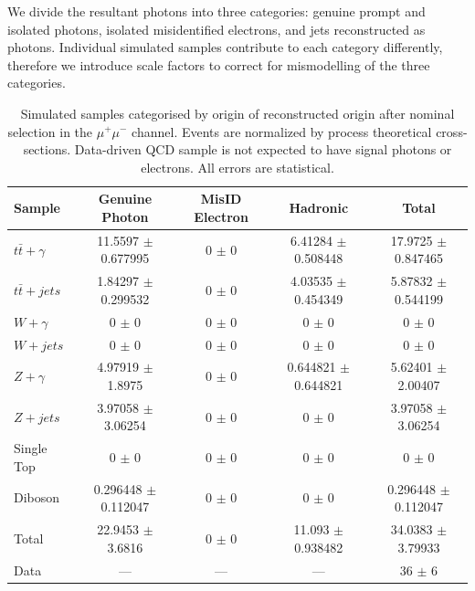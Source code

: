 We divide the resultant photons into three categories: genuine prompt and isolated photons, isolated misidentified electrons, and jets reconstructed as photons. Individual simulated samples contribute to each category differently, therefore we introduce scale factors to correct for mismodelling of the three categories. 

\begin{table}
\resizebox{\columnwidth}{!} {
\begin{tabular}{l|ccc|c}
\hline
	\textbf{Sample} & \textbf{Genuine Photon} & \textbf{MisID Electron} & \textbf{Hadronic} & \textbf{Total} \\
\hline
$t\bar{t}+\gamma$  & 11.5597 $\pm$ 0.677995 & 0 $\pm$ 0 & 6.41284 $\pm$ 0.508448 & 17.9725 $\pm$ 0.847465 \\
$t\bar{t}+jets$  & 1.84297 $\pm$ 0.299532 & 0 $\pm$ 0 & 4.03535 $\pm$ 0.454349 & 5.87832 $\pm$ 0.544199 \\
$W+\gamma$  & 0 $\pm$ 0 & 0 $\pm$ 0 & 0 $\pm$ 0 & 0 $\pm$ 0 \\
$W+jets$  & 0 $\pm$ 0 & 0 $\pm$ 0 & 0 $\pm$ 0 & 0 $\pm$ 0 \\
$Z+\gamma$  & 4.97919 $\pm$ 1.8975 & 0 $\pm$ 0 & 0.644821 $\pm$ 0.644821 & 5.62401 $\pm$ 2.00407 \\
$Z+jets$  & 3.97058 $\pm$ 3.06254 & 0 $\pm$ 0 & 0 $\pm$ 0 & 3.97058 $\pm$ 3.06254 \\
Single Top  & 0 $\pm$ 0 & 0 $\pm$ 0 & 0 $\pm$ 0 & 0 $\pm$ 0 \\
Diboson  & 0.296448 $\pm$ 0.112047 & 0 $\pm$ 0 & 0 $\pm$ 0 & 0.296448 $\pm$ 0.112047 \\
\hline
Total  & 22.9453 $\pm$ 3.6816 & 0 $\pm$ 0 & 11.093 $\pm$ 0.938482 & 34.0383 $\pm$ 3.79933 \\
Data  & --- & --- & --- & 36 $\pm$ 6 \\
\hline	
\end{tabular}
}
\caption{Simulated samples categorised by origin of reconstructed origin after nominal selection in the $\mu^+\mu^-$ channel. Events are normalized by process theoretical cross-sections. Data-driven QCD sample is not expected to have signal photons or electrons. All errors are statistical.}
\label{tab-SigPhotonsMuMu}
\end{table}	

